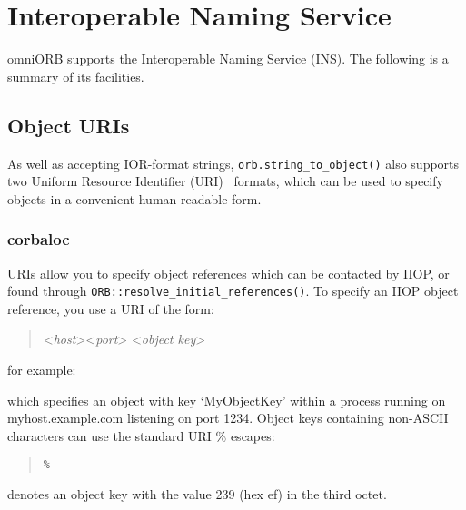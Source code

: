 \documentclass[11pt,oneside,a4paper]{book}
\newcommand{\op}[1]{\texttt{#1()}}
\begin{document}
\chapter{Interoperable Naming Service}
\label{chap:ins}

omniORB supports the Interoperable Naming Service (INS). The following
is a summary of its facilities.


\section{Object URIs}

As well as accepting IOR-format strings, \op{orb.string\_to\_object}
also supports two Uniform Resource Identifier (URI)~\cite{rfc2396}
formats, which can be used to specify objects in a convenient
human-readable form.

\subsection{corbaloc}

 URIs allow you to specify object references which
can be contacted by IIOP, or found through
\op{ORB::resolve\_initial\_references}. To specify an IIOP object
reference, you use a URI of the form:

\begin{quote}
<\textit{host}>\corbauri{:}<\textit{port}>%
\corbauri{/}<\textit{object key}>
\end{quote}

\noindent for example:

\begin{quote}
\end{quote}

\noindent which specifies an object with key `MyObjectKey' within a
process running on myhost.example.com listening on port 1234. Object
keys containing non-ASCII characters can use the standard URI \%
escapes:

\begin{quote}
%
\texttt{\%}%
\end{quote}

\noindent denotes an object key with the value 239 (hex ef) in the
third octet.
\end{document}

